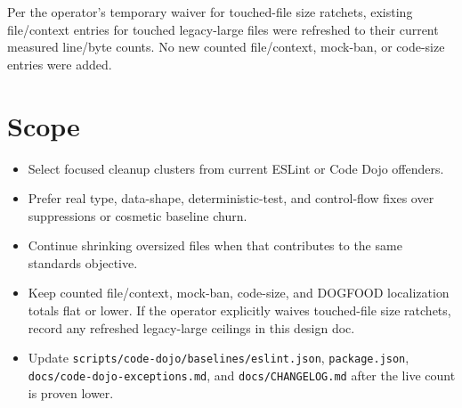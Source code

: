 Per the operator's temporary waiver for touched-file size ratchets, existing file/context entries for touched legacy-large files were refreshed to their current measured line/byte counts. No new counted file/context, mock-ban, or code-size entries were added.

\section{Scope}\label{record-240-scope}

\begin{itemize}
\tightlist
\item
  Select focused cleanup clusters from current ESLint or Code Dojo offenders.
\item
  Prefer real type, data-shape, deterministic-test, and control-flow fixes over suppressions or cosmetic baseline churn.
\item
  Continue shrinking oversized files when that contributes to the same standards objective.
\item
  Keep counted file/context, mock-ban, code-size, and DOGFOOD localization totals flat or lower. If the operator explicitly waives touched-file size ratchets, record any refreshed legacy-large ceilings in this design doc.
\item
  Update \texttt{s\allowbreak{}c\allowbreak{}r\allowbreak{}i\allowbreak{}p\allowbreak{}t\allowbreak{}s\allowbreak{}/\allowbreak{}c\allowbreak{}o\allowbreak{}d\allowbreak{}e\allowbreak{}-\allowbreak{}d\allowbreak{}o\allowbreak{}j\allowbreak{}o\allowbreak{}/\allowbreak{}b\allowbreak{}a\allowbreak{}s\allowbreak{}e\allowbreak{}l\allowbreak{}i\allowbreak{}n\allowbreak{}e\allowbreak{}s\allowbreak{}/\allowbreak{}e\allowbreak{}s\allowbreak{}l\allowbreak{}i\allowbreak{}n\allowbreak{}t\allowbreak{}.\allowbreak{}j\allowbreak{}s\allowbreak{}o\allowbreak{}n}, \texttt{p\allowbreak{}a\allowbreak{}c\allowbreak{}k\allowbreak{}a\allowbreak{}g\allowbreak{}e\allowbreak{}.\allowbreak{}j\allowbreak{}s\allowbreak{}o\allowbreak{}n}, \texttt{d\allowbreak{}o\allowbreak{}c\allowbreak{}s\allowbreak{}/\allowbreak{}c\allowbreak{}o\allowbreak{}d\allowbreak{}e\allowbreak{}-\allowbreak{}d\allowbreak{}o\allowbreak{}j\allowbreak{}o\allowbreak{}-\allowbreak{}e\allowbreak{}x\allowbreak{}c\allowbreak{}e\allowbreak{}p\allowbreak{}t\allowbreak{}i\allowbreak{}o\allowbreak{}n\allowbreak{}s\allowbreak{}.\allowbreak{}m\allowbreak{}d}, and \texttt{d\allowbreak{}o\allowbreak{}c\allowbreak{}s\allowbreak{}/\allowbreak{}C\allowbreak{}H\allowbreak{}A\allowbreak{}N\allowbreak{}G\allowbreak{}E\allowbreak{}L\allowbreak{}O\allowbreak{}G\allowbreak{}.\allowbreak{}m\allowbreak{}d} after the live count is proven lower.
\end{itemize}

